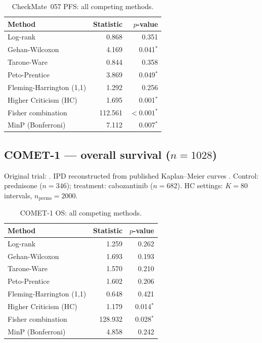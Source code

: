 \documentclass[11pt]{article}
\newcommand{\sig}{$^{\ast}$}
\begin{document}
\begin{table}[h]
  \centering
  \caption{CheckMate~057 PFS: all competing methods.}
  \label{tab:checkmate}
  \begin{tabular}{@{}lrr@{}}
    \toprule
    Method & Statistic & $p$-value \\
    \midrule
    Log-rank                         &  0.868 & 0.351 \\
    Gehan-Wilcoxon                   &  4.169 & 0.041\sig \\
    Tarone-Ware                      &  0.844 & 0.358 \\
    Peto-Prentice                    &  3.869 & 0.049\sig \\
    Fleming-Harrington (1,1)         &  1.292 & 0.256 \\
    Higher Criticism (HC)            &  1.695 & 0.001\sig \\
    Fisher combination               & 112.561 & $<0.001$\sig \\
    MinP (Bonferroni)                &  7.112 & 0.007\sig \\
    \bottomrule
  \end{tabular}
\end{table}

\subsection*{COMET-1 --- overall survival ($n=1028$)}

Original trial: \citet{smith2016}.
IPD reconstructed from published Kaplan--Meier curves
\citep{guyot2012}.
Control: prednisone ($n=346$); treatment: cabozantinib ($n=682$).
HC settings: $K=80$ intervals, $n_\mathrm{perms}=2000$.

\begin{table}[h]
  \centering
  \caption{COMET-1 OS: all competing methods.}
  \label{tab:comet}
  \begin{tabular}{@{}lrr@{}}
    \toprule
    Method & Statistic & $p$-value \\
    \midrule
    Log-rank                         &  1.259 & 0.262 \\
    Gehan-Wilcoxon                   &  1.693 & 0.193 \\
    Tarone-Ware                      &  1.570 & 0.210 \\
    Peto-Prentice                    &  1.602 & 0.206 \\
    Fleming-Harrington (1,1)         &  0.648 & 0.421 \\
    Higher Criticism (HC)            &  1.179 & 0.014\sig \\
    Fisher combination               & 128.932 & 0.028\sig \\
    MinP (Bonferroni)                &  4.858 & 0.242 \\
    \bottomrule
  \end{tabular}
\end{table}
\end{document}
